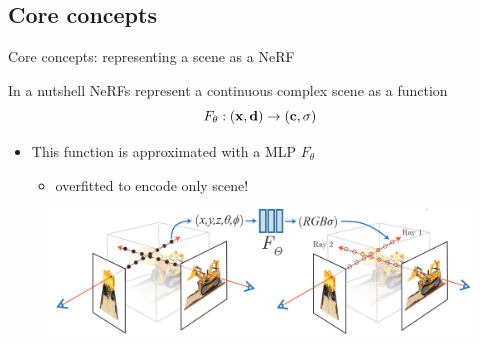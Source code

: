 \documentclass[aspectratio=1610]{beamer}
\begin{document}
\subsection{Core concepts}
\begin{frame}{Core concepts: representing a scene as a NeRF}
    \begin{block}{In a nutshell}
        NeRFs represent a continuous complex scene as a function 
        \begin{equation*}
            F_\theta : (\vb{x}, \vb{d}) \rightarrow (\vb{c}, \sigma)
        \end{equation*}
    \end{block}
    \begin{itemize}
        \item This function is approximated with a MLP \(F_\theta\)
        \begin{itemize}
            \item  overfitted to encode only scene!
        \end{itemize}
    \end{itemize}
    \bigskip
    \begin{figure}[H]
        \centering
        \includegraphics[width=.7\textwidth,keepaspectratio]{mapping}
    \end{figure}
\end{frame}
\end{document}
